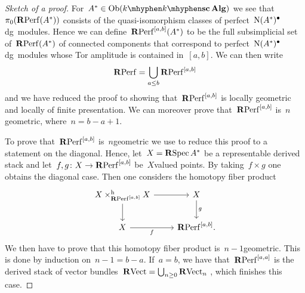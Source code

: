 \begin{refsection}
\begin{theorem}
\begin{proof}[Sketch of a proof]
    For~$A^*\in\Ob(k\mhyphen\scAlg)$ we see that~$\pi_0(\mathbf{R}\mathrm{Perf}(A^*))$ consists of the quasi-isomorphism classes of perfect~$\operatorname{N}(A^*)^\bullet$\dash dg~modules. Hence we can define~$\mathbf{R}\mathrm{Perf}^{[a,b]}(A^*)$ to be the full subsimplicial set of~$\mathbf{R}\mathrm{Perf}(A^*)$ of connected components that correspond to perfect~$\operatorname{N}(A^*)^\bullet$\dash dg~modules whose Tor amplitude is contained in~$[a,b]$. We can then write
    \begin{equation}
      \mathbf{R}\mathrm{Perf}=\bigcup_{a\leq b}\mathbf{R}\mathrm{Perf}^{[a,b]}
    \end{equation}
    and we have reduced the proof to showing that~$\mathbf{R}\mathrm{Perf}^{[a,b]}$ is locally geometric and locally of finite presentation. We can moreover prove that~$\mathbf{R}\mathrm{Perf}^{[a,b]}$ is~$n$\dash geometric, where~$n=b-a+1$.

    To prove that~$\mathbf{R}\mathrm{Perf}^{[a,b]}$ is~$n$\dash geometric we use \cite[lemma 2.18]{toen-vaquie} to reduce this proof to a statement on the diagonal. Hence, let~$X=\operatorname{\mathbf{R}Spec} A^*$ be a representable derived stack and let~$f,g\colon X\to\mathbf{R}\mathrm{Perf}^{[a,b]}$ be~$X$\dash valued points. By taking~$f\times g$ one obtains the diagonal case. Then one considers the homotopy fiber product
    \begin{equation}
      \begin{tikzcd}
        X\times_{\RPerf^{[a,b]}}^{\mathrm{h}}X \arrow{r} \arrow{d} & X \arrow{d}{g} \\
        X \arrow[swap]{r}{f} & \RPerf^{[a,b]}.
      \end{tikzcd}
    \end{equation}
    We then have to prove that this homotopy fiber product is~$n-1$\dash geometric. This is done by induction on~$n-1=b-a$. If~$a=b$, we have that~$\mathbf{R}\mathrm{Perf}^{[a,a]}$ is the derived stack of vector bundles~$\mathbf{R}\mathrm{Vect}=\bigcup_{n\geq 0}\mathbf{R}\mathrm{Vect}_n$ \cite[corollary 1.3.7.4]{hagII}, which finishes this case.


\end{proof}
\end{theorem}
\end{refsection}
